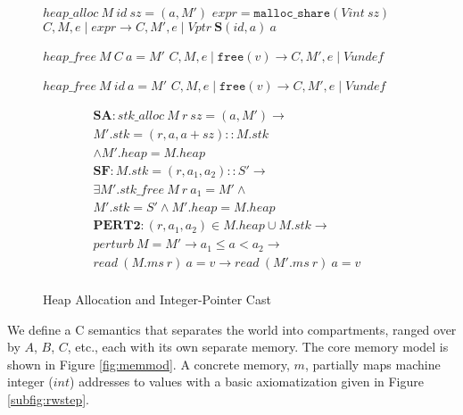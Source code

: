 \documentclass{article}
\begin{document}
\begin{figure}
\begin{minipage}[t]{0.65\textwidth}
                    {\(\mathit{heap\_alloc} ~ M ~ id ~ sz = (a, M')\)}
                    {\(\mathit{expr} = \mathtt{malloc\_share}(\mathit{Vint} ~ sz)\)}
                    {\(C,M,e \mid \mathit{expr} \longrightarrow
                      C,M',e \mid \mathit{Vptr} ~ \mathbf{S}(id,a) ~ a\)}

              {\(\mathit{heap\_free} ~ M ~ C ~ a = M'\)}
              {\(C,M,e \mid \mathtt{free}(v) \longrightarrow
                C,M',e \mid \mathit{Vundef}\)}

             {\(\mathit{heap\_free} ~ M ~ id ~ a = M'\)}
             {\(C,M,e \mid \mathtt{free}(v)  \longrightarrow
               C,M',e \mid \mathit{Vundef}\)}

  \[\begin{split}
    \mathbf{SA} : \mathit{stk\_alloc} ~ M ~ r ~ sz = (a, M') \rightarrow & \\
    M'.stk = (r,a,a+sz)::M.stk & \\
    \land M'.heap = M.heap & \\[0.75em]
    \mathbf{SF} : M.stk = (r,a_1,a_2)::S' \rightarrow & \\
    \exists M' . \mathit{stk\_free} ~ M ~ r ~ a_1 = M' \land & \\
    M'.stk = S' \land M'.heap = M.heap & \\[0.75em]
    \mathbf{PERT2} : (r,a_1,a_2) \in M.heap \cup M.stk \rightarrow & \\
    \mathit{perturb} ~ M = M' \rightarrow
    a_1 \leq a < a_2 \rightarrow & \\
    \mathit{read} ~ (M.ms ~ r) ~ a = v \rightarrow 
    \mathit{read} ~ (M'.ms ~ r) ~ a = v & \\[0.75em]
  \end{split}\]
  \end{minipage}

  \caption{Heap Allocation and Integer-Pointer Cast}
  \label{subfig:alstep}
\end{figure}

We define a C semantics that separates the world into compartments, ranged over by
\(A\), \(B\), \(C\), etc., each with its own separate memory. The core memory model
is shown in Figure \ref{fig:memmod}. A concrete memory, \(m\), partially maps machine
integer (\(\mathit{int}\)) addresses to values with a basic axiomatization given in
Figure \ref{subfig:rwstep}.
\end{document}
